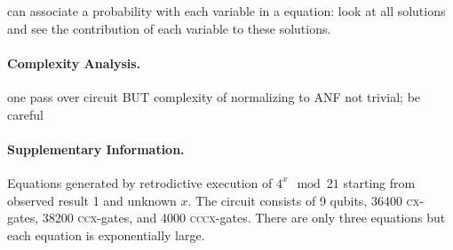 \documentclass{article}
\newcommand{\cx}{\textsc{cx}}
\newcommand{\ccx}{\textsc{ccx}}
\newcommand{\cccx}{\textsc{cccx}}
\begin{document}
\begin{refsection}
can associate a probability with each variable in a equation: look at
all solutions and see the contribution of each variable to these
solutions.

\paragraph*{Complexity Analysis.}
one pass over circuit BUT complexity of normalizing to ANF not trivial; be careful

\paragraph*{Supplementary Information.} 
\label{par:shor21}

Equations generated by retrodictive execution of $4^x \mod{21}$
starting from observed result 1 and unknown $x$. The circuit consists
of 9 qubits, 36400 \cx-gates, 38200 \ccx-gates, and 4000
\cccx-gates. There are only three equations but each equation is
exponentially large.


\end{refsection}
\end{document}
